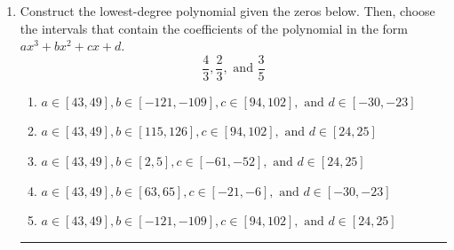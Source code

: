 \documentclass[14pt]{extbook}
\newcommand{\litem}[1]{\item#1\hspace*{-1cm}\rule{\textwidth}{0.4pt}}
\begin{document}
\begin{enumerate}
{\begin{enumerate}[label=\Alph*.]
\end{enumerate} }
\litem{
Construct the lowest-degree polynomial given the zeros below. Then, choose the intervals that contain the coefficients of the polynomial in the form $ax^3+bx^2+cx+d$.\[ \frac{4}{3}, \frac{2}{3}, \text{ and } \frac{3}{5} \]\begin{enumerate}[label=\Alph*.]
\item \( a \in [43, 49], b \in [-121, -109], c \in [94, 102], \text{ and } d \in [-30, -23] \)
\item \( a \in [43, 49], b \in [115, 126], c \in [94, 102], \text{ and } d \in [24, 25] \)
\item \( a \in [43, 49], b \in [2, 5], c \in [-61, -52], \text{ and } d \in [24, 25] \)
\item \( a \in [43, 49], b \in [63, 65], c \in [-21, -6], \text{ and } d \in [-30, -23] \)
\item \( a \in [43, 49], b \in [-121, -109], c \in [94, 102], \text{ and } d \in [24, 25] \)


\end{enumerate}}
\end{enumerate}
\end{document}
